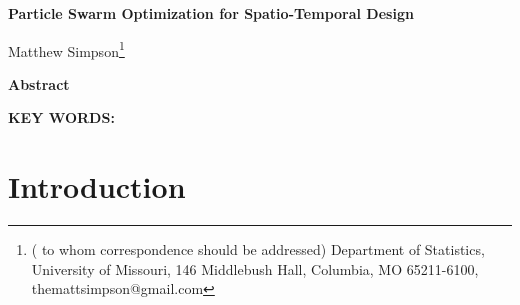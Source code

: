 \documentclass[12pt]{article}
\begin{document}
\thispagestyle{empty} \baselineskip=28pt

\begin{center}
{\LARGE{\bf Particle Swarm Optimization for Spatio-Temporal Design}}
\end{center}

\baselineskip=12pt
\vskip 2mm
\blind
{
  \begin{center}
    Matthew Simpson\footnote{(\baselineskip=10pt to whom correspondence should be addressed)
      Department of Statistics, University of Missouri,
      146 Middlebush Hall, Columbia, MO 65211-6100, themattsimpson@gmail.com}
  \end{center}
} \fi

\vskip 2mm
\begin{center}
{\large{\bf Abstract}}
\end{center}
\baselineskip=12pt 

\baselineskip=12pt
\par\vfill\noindent
{\bf KEY WORDS:} 

\par\medskip\noindent


\clearpage\pagebreak\newpage {}
\baselineskip=24pt

\section{Introduction}
\end{document}
